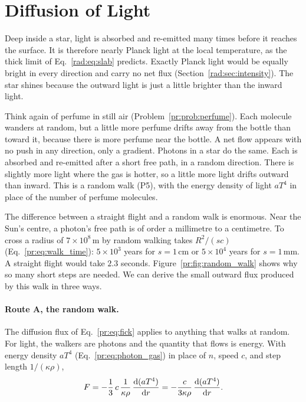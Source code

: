 \section{Diffusion of Light}
\label{rad:sec:diffusion}

Deep inside a star, light is absorbed and re-emitted many times before it reaches the surface. It is therefore nearly Planck light at the local temperature, as the thick limit of Eq.~\eqref{rad:eq:slab} predicts. Exactly Planck light would be equally bright in every direction and carry no net flux (Section~\ref{rad:sec:intensity}). The star shines because the outward light is just a little brighter than the inward light.

Think again of perfume in still air (Problem~\ref{pr:prob:perfume}). Each molecule wanders at random, but a little more perfume drifts away from the bottle than toward it, because there is more perfume near the bottle. A net flow appears with no push in any direction, only a gradient. Photons in a star do the same. Each is absorbed and re-emitted after a short free path, in a random direction. There is slightly more light where the gas is hotter, so a little more light drifts outward than inward. This is a random walk (P5), with the energy density of light $aT^4$ in place of the number of perfume molecules.

The difference between a straight flight and a random walk is enormous. Near the Sun's centre, a photon's free path is of order a millimetre to a centimetre. To cross a radius of $7\times10^8\,\mathrm m$ by random walking takes $R^2/(sc)$ (Eq.~\eqref{pr:eq:walk_time}): $5\times10^3$ years for $s=1\,\mathrm{cm}$ or $5\times10^4$ years for $s=1\,\mathrm{mm}$. A straight flight would take $2.3$ seconds. Figure~\ref{pr:fig:random_walk} shows why so many short steps are needed. We can derive the small outward flux produced by this walk in three ways.

\paragraph{Route A, the random walk.} The diffusion flux of Eq.~\eqref{pr:eq:fick} applies to anything that walks at random. For light, the walkers are photons and the quantity that flows is energy. With energy density $aT^4$ (Eq.~\eqref{pr:eq:photon_gas}) in place of $n$, speed $c$, and step length $1/(\kappa\rho)$,
\begin{equation}
	F=-\frac13\,c\,\frac{1}{\kappa\rho}\,\dv{(aT^4)}{r}=-\frac{c}{3\kappa\rho}\,\dv{(aT^4)}{r}.
	\label{rad:eq:diffusion_flux}
\end{equation}

